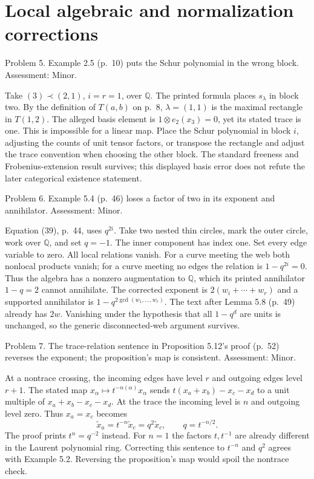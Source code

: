 \documentclass[10pt]{article}
\begin{document}
\section*{Local algebraic and normalization corrections}
Problem 5.  Example 2.5 (p. 10) puts the Schur polynomial in the wrong block. Assessment: Minor.\par
Take \((3)\prec(2,1)\), \(i=r=1\), over \(\mathbb Q\). The printed formula places \(s_\lambda\) in block two. By the definition of \(T(a,b)\) on p. 8, \(\lambda=(1,1)\) is the maximal rectangle in \(T(1,2)\). The alleged basis element is \(1\otimes e_2(x_3)=0\), yet its stated trace is one. This is impossible for a linear map. Place the Schur polynomial in block \(i\), adjusting the counts of unit tensor factors, or transpose the rectangle and adjust the trace convention when choosing the other block. The standard freeness and Frobenius-extension result survives; this displayed basis error does not refute the later categorical existence statement.\par
Problem 6.  Example 5.4 (p. 46) loses a factor of two in its exponent and annihilator. Assessment: Minor.\par
Equation (39), p. 44, uses \(q^{2i}\). Take two nested thin circles, mark the outer circle, work over \(\mathbb Q\), and set \(q=-1\). The inner component has index one. Set every edge variable to zero. All local relations vanish. For a curve meeting the web both nonlocal products vanish; for a curve meeting no edges the relation is \(1-q^{2i}=0\). Thus the algebra has a nonzero augmentation to \(\mathbb Q\), which its printed annihilator \(1-q=2\) cannot annihilate. The corrected exponent is \(2(w_i+\cdots+w_r)\) and a supported annihilator is \(1-q^{2\gcd(w_1,\ldots,w_r)}\). The text after Lemma 5.8 (p. 49) already has \(2w\). Vanishing under the hypothesis that all \(1-q^d\) are units is unchanged, so the generic disconnected-web argument survives.\par
Problem 7.  The trace-relation sentence in Proposition 5.12’s proof (p. 52) reverses the exponent; the proposition’s map is consistent. Assessment: Minor.\par
At a nontrace crossing, the incoming edges have level \(r\) and outgoing edges level \(r+1\). The stated map \(x_\alpha\mapsto t^{-n(\alpha)}x_\alpha\) sends \(t(x_a+x_b)-x_c-x_d\) to a unit multiple of \(x_a+x_b-x_c-x_d\). At the trace the incoming level is \(n\) and outgoing level zero. Thus \(x_a=x_c\) becomes \[\widetilde x_a=t^{-n}\widetilde x_c
              =q^2\widetilde x_c,\qquad q=t^{-n/2}.\] The proof prints \(t^n=q^{-2}\) instead. For \(n=1\) the factors \(t,t^{-1}\) are already different in the Laurent polynomial ring. Correcting this sentence to \(t^{-n}\) and \(q^2\) agrees with Example 5.2. Reversing the proposition’s map would spoil the nontrace check.\par
\end{document}
